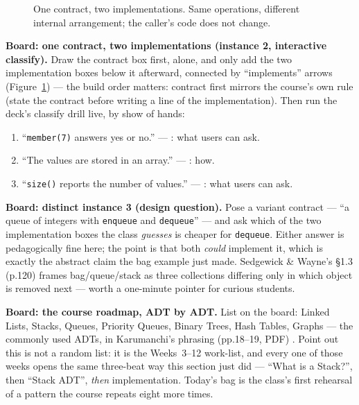 \documentclass[11pt]{article}
\begin{document}
\begin{figure}[h]
  \centering
  \caption{One contract, two implementations. Same operations, different
  internal arrangement; the caller's code does not change.}
  \label{fig:adt}
\end{figure}

\textbf{Board: one contract, two implementations (instance 2, interactive classify).} Draw the contract box first, alone, and only add the two implementation boxes below it afterward, connected by ``implements'' arrows (Figure~\ref{fig:adt}) --- the build order matters: contract first mirrors the course's own rule (state the contract before writing a line of the implementation). Then run the deck's classify drill live, by show of hands:
\begin{enumerate}
  \item ``\texttt{member(7)} answers yes or no.'' --- : what users can ask.
  \item ``The values are stored in an array.'' --- : how.
  \item ``\texttt{size()} reports the number of values.'' --- : what users can ask.
\end{enumerate}

\textbf{Board: distinct instance 3 (design question).} Pose a variant contract --- ``a queue of integers with \texttt{enqueue} and \texttt{dequeue}'' --- and ask which of the two implementation boxes the class \emph{guesses} is cheaper for \texttt{dequeue}. Either answer is pedagogically fine here; the point is that both \emph{could} implement it, which is exactly the abstract claim the bag example just made. Sedgewick \& Wayne's \S1.3 (p.120) frames bag/queue/stack as three collections differing only in which object is removed next --- worth a one-minute pointer for curious students.

\textbf{Board: the course roadmap, ADT by ADT.} List on the board: Linked Lists, Stacks, Queues, Priority Queues, Binary Trees, Hash Tables, Graphs --- the commonly used ADTs, in Karumanchi's phrasing (pp.18--19, PDF) \cite{Karumanchi2017_data_structures_algorithms_made_easy}. Point out this is not a random list: it is the Weeks~3--12 work-list, and every one of those weeks opens the same three-beat way this section just did --- ``What is a Stack?'', then ``Stack ADT'', \emph{then} implementation. Today's bag is the class's first rehearsal of a pattern the course repeats eight more times.
\end{document}
